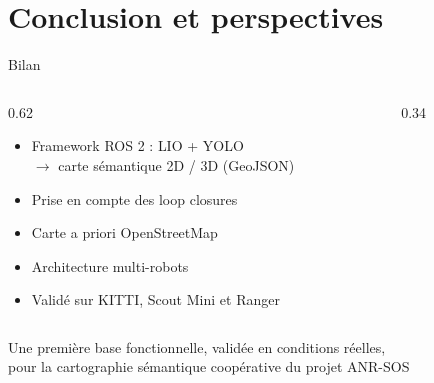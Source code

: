 \section{Conclusion et perspectives}

\begin{frame}{Bilan}
  \begin{columns}[c]
    \begin{column}{0.62\textwidth}
      \begin{itemize}
        \item[\ok] Framework \alert{ROS 2} : \alert{LIO + YOLO}\\
              $\rightarrow$ carte sémantique \alert{2D / 3D} (GeoJSON)
        \item[\ok] Prise en compte des \alert{loop closures}
        \item[\ok] \alert{Carte a priori} OpenStreetMap
        \item[\ok] Architecture \alert{multi-robots}
        \item[\ok] Validé sur \alert{KITTI}, \alert{Scout Mini} et \alert{Ranger}
      \end{itemize}
    \end{column}
    \begin{column}{0.34\textwidth}
      \centering
      \\
    \end{column}
  \end{columns}
  \vspace{0.35cm}
  \begin{tcolorbox}[question, width=0.85\textwidth]
    Une \alert{première base fonctionnelle}, validée en conditions réelles,\\
    pour la cartographie sémantique coopérative du projet ANR-SOS
  \end{tcolorbox}
\end{frame}

